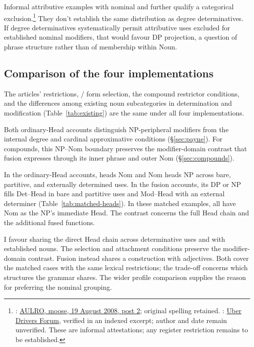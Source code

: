 \documentclass[12pt]{article}
\begin{document}
Informal attributive examples with nominal  and  further qualify a categorical exclusion.\footnote{: \href{https://www.aulro.com/afvb/motor-cycling/61858-my-track-day-phillip-island-motogp-track-post798794.html}{AULRO, moose, 19 August 2008, post 2}; original spelling retained. : \href{https://www.uberpeople.net/threads/let-s-play-would-you-have-taken-this-trip.395130/}{Uber Drivers Forum}, verified in an indexed excerpt; author and date remain unverified. These are informal attestations; any register restriction remains to be established.} They don't establish the same distribution as degree determinatives. If degree determinatives systematically permit attributive uses excluded for established nominal modifiers, that would favour DP projection, a question of phrase structure rather than of membership within Noun.

\subsection{Comparison of the four implementations}\label{sec:costs}

The articles' restrictions, / form selection, the compound restrictor conditions, and the differences among existing noun subcategories in determination and modification (Table~\ref{tab:existing}) are the same under all four implementations.

Both ordinary-Head accounts distinguish NP-peripheral modifiers from the internal degree and cardinal approximative conditions (§\ref{sec:payne}). For compounds, this NP--Nom boundary preserves the modifier-domain contrast that fusion expresses through its inner phrase and outer Nom (§\ref{sec:compounds}).

In the ordinary-Head accounts,  heads Nom and Nom heads NP across bare, partitive, and externally determined uses. In the fusion accounts, its DP or NP fills Det--Head in bare and partitive uses and Mod--Head with an external determiner (Table~\ref{tab:matched-heads}). In these matched examples, all have Nom as the NP's immediate Head. The contrast concerns the full Head chain and the additional fused functions.

I favour sharing the direct Head chain across determinative uses and with established nouns. The selection and attachment conditions preserve the modifier-domain contrast. Fusion instead shares a construction with adjectives. Both cover the matched cases with the same lexical restrictions; the trade-off concerns which structures the grammar shares. The wider profile comparison supplies the reason for preferring the nominal grouping.
\end{document}
